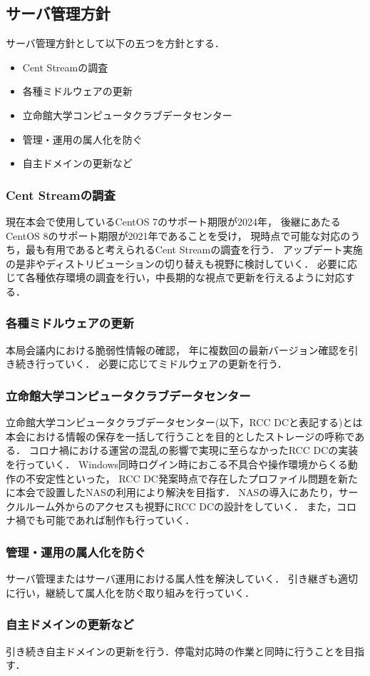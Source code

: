 \subsection*{サーバ管理方針}


サーバ管理方針として以下の五つを方針とする．
\begin{itemize}
    \item Cent Streamの調査
    \item 各種ミドルウェアの更新
    \item 立命館大学コンピュータクラブデータセンター
    \item 管理・運用の属人化を防ぐ
    \item 自主ドメインの更新など
\end{itemize}

\subsubsection*{Cent Streamの調査}
現在本会で使用しているCentOS 7のサポート期限が2024年，
後継にあたるCentOS 8のサポート期限が2021年であることを受け，
現時点で可能な対応のうち，最も有用であると考えられるCent Streamの調査を行う．
アップデート実施の是非やディストリビューションの切り替えも視野に検討していく．
必要に応じて各種依存環境の調査を行い，中長期的な視点で更新を行えるように対応する．

\subsubsection*{各種ミドルウェアの更新}
本局会議内における脆弱性情報の確認，
年に複数回の最新バージョン確認を引き続き行っていく．
必要に応じてミドルウェアの更新を行う．

\subsubsection*{立命館大学コンピュータクラブデータセンター}
立命館大学コンピュータクラブデータセンター(以下，RCC DCと表記する)とは本会における情報の保存を一括して行うことを目的としたストレージの呼称である．
コロナ禍における運営の混乱の影響で実現に至らなかったRCC DCの実装を行っていく．
Windows同時ログイン時におこる不具合や操作環境からくる動作の不安定性といった，
RCC DC発案時点で存在したプロファイル問題を新たに本会で設置したNASの利用により解決を目指す．
NASの導入にあたり，サークルルーム外からのアクセスも視野にRCC DCの設計をしていく．
また，コロナ禍でも可能であれば制作も行っていく．

\subsubsection*{管理・運用の属人化を防ぐ}
サーバ管理またはサーバ運用における属人性を解決していく．
引き継ぎも適切に行い，継続して属人化を防ぐ取り組みを行っていく．

\subsubsection*{自主ドメインの更新など}
引き続き自主ドメインの更新を行う．停電対応時の作業と同時に行うことを目指す．
